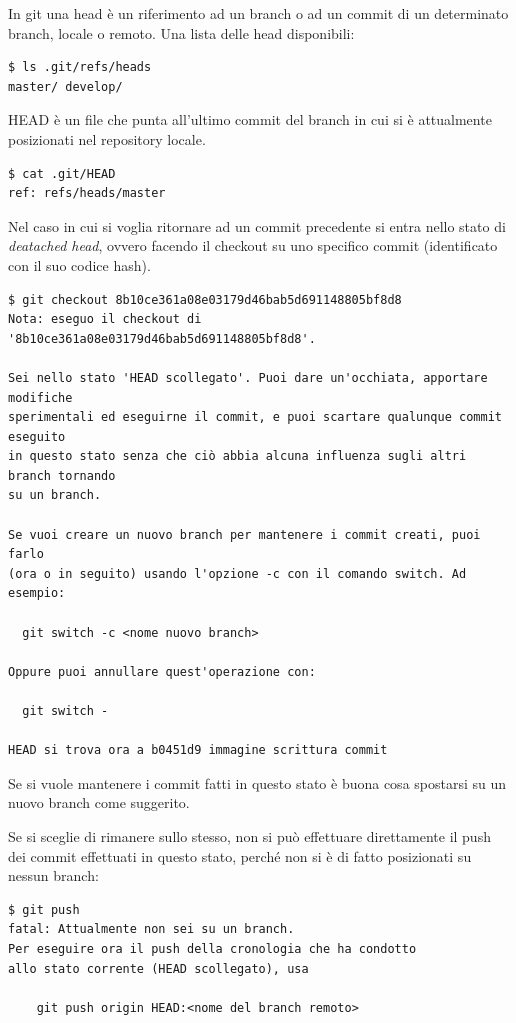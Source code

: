 \documentclass{article} \usepackage[textwidth=18cm,textheight=18cm]{geometry}
\begin{document}
In git una head è un riferimento ad un branch o ad un commit di un determinato
branch, locale o remoto. Una lista delle head disponibili:

\begin{verbatim}
$ ls .git/refs/heads
master/ develop/
\end{verbatim}

HEAD è un file che punta all'ultimo commit del branch in cui si è attualmente
posizionati nel repository locale.

\begin{verbatim}
$ cat .git/HEAD
ref: refs/heads/master
\end{verbatim}

Nel caso in cui si voglia ritornare ad un commit precedente si entra nello stato
di \emph{deatached head}, ovvero facendo il checkout su uno specifico commit
(identificato con il suo codice hash).

\begin{verbatim}
$ git checkout 8b10ce361a08e03179d46bab5d691148805bf8d8
Nota: eseguo il checkout di '8b10ce361a08e03179d46bab5d691148805bf8d8'.

Sei nello stato 'HEAD scollegato'. Puoi dare un'occhiata, apportare modifiche
sperimentali ed eseguirne il commit, e puoi scartare qualunque commit eseguito
in questo stato senza che ciò abbia alcuna influenza sugli altri branch tornando
su un branch.

Se vuoi creare un nuovo branch per mantenere i commit creati, puoi farlo
(ora o in seguito) usando l'opzione -c con il comando switch. Ad esempio:

  git switch -c <nome nuovo branch>

Oppure puoi annullare quest'operazione con:

  git switch -

HEAD si trova ora a b0451d9 immagine scrittura commit
\end{verbatim}

Se si vuole mantenere i commit fatti in questo stato è buona cosa spostarsi su
un nuovo branch come suggerito.

Se si sceglie di rimanere sullo stesso, non si può effettuare direttamente il push dei
commit effettuati in questo stato, perché non si è di fatto posizionati su nessun branch:

\begin{verbatim}
$ git push
fatal: Attualmente non sei su un branch.
Per eseguire ora il push della cronologia che ha condotto
allo stato corrente (HEAD scollegato), usa

    git push origin HEAD:<nome del branch remoto>
\end{verbatim}
\end{document}
